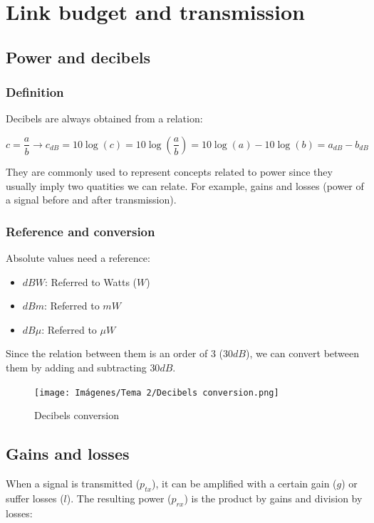 \documentclass[
	12pt,
	twoside
]{book}
\begin{document}
\section{Link budget and transmission}

\subsection{Power and decibels}

\subsubsection{Definition}

Decibels are always obtained from a relation:

$$
	c = \frac {a} {b} \rightarrow c_{dB} = 10 \log (c) = 10 \log \left( \frac {a} {b} \right) = 10 \log (a) - 10 \log (b) = a_{dB} - b_{dB}
$$

They are commonly used to represent concepts related to power since they usually imply two quatities we can relate. For example, gains and losses (power of a signal before and after transmission).

\subsubsection{Reference and conversion}

Absolute values need a reference:

\begin{itemize}
	\item $dBW$: Referred to Watts ($W$)
	\item $dBm$: Referred to $mW$
	\item $dB\mu$: Referred to $\mu W$
\end{itemize}

Since the relation between them is an order of 3 ($30 dB$), we can convert between them by adding and subtracting $30 dB$.

\begin{figure}[H]
	\centering
	\texttt{[image: Imágenes/Tema 2/Decibels conversion.png]}
	\caption{
		\label{fig:unit2_dedibels}
		Decibels conversion
	}
\end{figure}

\subsection{Gains and losses}

When a signal is transmitted ($p_{tx}$), it can be amplified with a certain gain ($g$) or suffer losses ($l$). The resulting power ($p_{rx}$) is the product by gains and division by losses:
\end{document}
